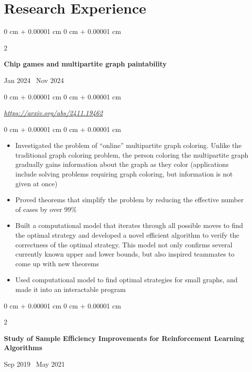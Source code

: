 \documentclass[10pt, letterpaper]{article}
\newenvironment{highlights}{
    \begin{itemize}[
        topsep=0.10 cm,
        parsep=0.10 cm,
        partopsep=0pt,
        itemsep=0pt,
        leftmargin=0 cm + 10pt
    ]
}{
    \end{itemize}
} %
\newenvironment{onecolentry}{
    \begin{adjustwidth}{
        0 cm + 0.00001 cm
    }{
        0 cm + 0.00001 cm
    }
}{
    \end{adjustwidth}
} %
\newenvironment{twocolentry}[2][]{
    \onecolentry
    \def\secondColumn{#2}
    \setcolumnwidth{\fill, 4.5 cm}
    \begin{paracol}{2}
}{
    \switchcolumn \raggedleft \secondColumn
    \end{paracol}
    \endonecolentry
} %
\begin{document}
\section{Research Experience}
    \begin{twocolentry}{Jan 2024 \textendash\ Nov 2024}
        \textbf{Chip games and multipartite graph paintability}
    \end{twocolentry}

    \vspace{0.10 cm}
    \begin{onecolentry}
        \href{https://arxiv.org/abs/2411.19462}{\textit{https://arxiv.org/abs/2411.19462}}
    \end{onecolentry}

    \vspace{0.10 cm}
    \begin{onecolentry}
    \begin{highlights}
        \item Investigated the problem of “online” multipartite graph coloring. Unlike the traditional graph coloring problem, the person coloring the multipartite graph gradually gains information about the graph as they color (applications include solving problems requiring graph coloring, but information is not given at once)
        \item Proved theorems that simplify the problem by reducing the effective number of cases by over 99\%
        \item Built a computational model that iterates through all possible moves to find the optimal strategy and developed a novel efficient algorithm to verify the correctness of the optimal strategy. This model not only confirms several currently known upper and lower bounds, but also inspired teammates to come up with new theorems
        \item Used computational model to find optimal strategies for small graphs, and made it into an interactable program
    \end{highlights}
    \end{onecolentry}

    \vspace{0.20 cm}

    \begin{twocolentry}{Sep 2019 \textendash\ May 2021}
        \textbf{Study of Sample Efficiency Improvements for Reinforcement Learning Algorithms}
    \end{twocolentry}
\end{document}
